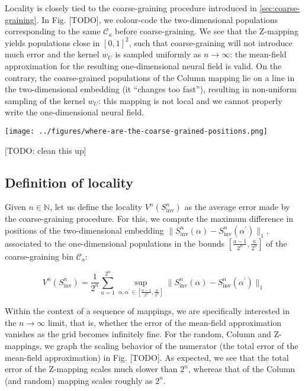 \documentclass[10pt,letterpaper]{article}
\newcommand{\norm}[1]{\lVert{#1}\rVert}
\begin{document}
Locality is closely tied to the coarse-graining procedure introduced in \autoref{sec:coarse-graining}. 
In Fig. [TODO], we colour-code the two-dimensional populations corresponding to the same $\mathcal{C}_a$ before coarse-graining.
We see that the Z-mapping yields populations close in $[0,1]^2$, such that coarse-graining will not introduce much error and the kernel $w_U$ is sampled uniformly as $n \to \infty$: the mean-field approximation for the resulting one-dimensional neural field is valid. On the contrary, the coarse-grained populations of the Column mapping lie on a line in the two-dimensional embedding (it ``changes too fast''), resulting in non-uniform sampling of the kernel $w_U$: this mapping is not local and we cannot properly write the one-dimensional neural field.

\texttt{[image: ../figures/where-are-the-coarse-grained-positions.png]}

[TODO: clean this up]
\endif

\subsection{Definition of locality}

Given $n \in \mathbb N$, let us define the locality $V^n(S^n_\textrm{inv})$ as the average error made by the coarse-graining procedure. For this, we compute the maximum difference in positions of the two-dimensional embedding $\norm{S^n_\textrm{inv}(\alpha) - S^n_\textrm{inv}(\alpha^\prime)}_1$, associated to the one-dimensional populations in the bounds $\left[\tfrac{a-1}{2^n}, \tfrac{a}{2^n}\right]$ of the coarse-graining bin $\mathcal C_a$:

\begin{equation} \label{eq:def-V}
V^n(S^n_\textrm{inv}) = \frac{1}{2^n} \sum_{a=1}^{2^n} \sup_{\alpha, \alpha^\prime \in \left[\frac{a-1}{2^n}, \frac{a}{2^n} \right]} \norm{S^n_\textrm{inv}(\alpha) - S^n_\textrm{inv}(\alpha^\prime)}_1
\end{equation}

Within the context of a sequence of mappings, we are specifically interested in the $n \to \infty$ limit, that is, whether the error of the mean-field approximation vanishes as the grid becomes infinitely fine. For the random, Column and Z-mappings, we graph the scaling behavior of the numerator (the total error of the mean-field approximation) in Fig. [TODO]. As expected, we see that the total error of the Z-mapping scales much slower than $2^n$, whereas that of the Column (and random) mapping scales roughly as $2^n$.
\end{document}
